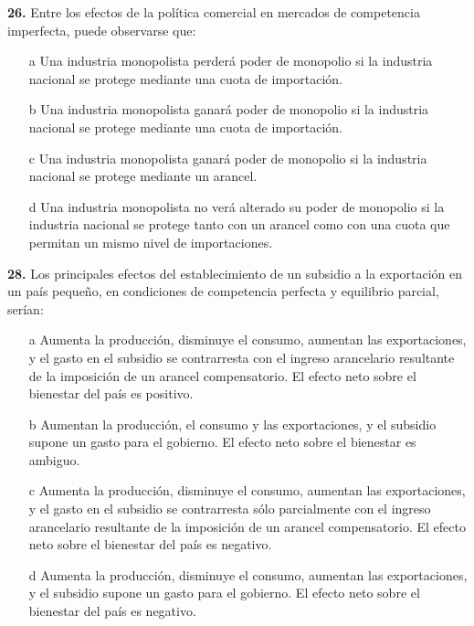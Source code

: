 \documentclass{nuevotema}
\begin{document}

\textbf{26.} Entre los efectos de la política comercial en mercados de competencia imperfecta, puede observarse que:

\begin{itemize}
 	\item[a] Una industria monopolista perderá poder de monopolio si la industria nacional se protege mediante una cuota de importación.
	\item[b] Una industria monopolista ganará poder de monopolio si la industria nacional se protege mediante una cuota de importación.
	\item[c] Una industria monopolista ganará poder de monopolio si la industria nacional se protege mediante un arancel.
	\item[d] Una industria monopolista no verá alterado su poder de monopolio si la industria nacional se protege tanto con un arancel como con una cuota que permitan un mismo nivel de importaciones.
\end{itemize}


\textbf{28.} Los principales efectos del establecimiento de un subsidio a la exportación en un país pequeño, en condiciones de competencia perfecta y equilibrio parcial, serían:

\begin{itemize}
	\item[a] Aumenta la producción, disminuye el consumo, aumentan las exportaciones, y el gasto en el subsidio se contrarresta con el ingreso arancelario resultante de la imposición de un arancel compensatorio. El efecto neto sobre el bienestar del país es positivo.
	\item[b] Aumentan la producción, el consumo y las exportaciones, y el subsidio supone un gasto para el gobierno. El efecto neto sobre el bienestar es ambiguo.
	\item[c] Aumenta la producción, disminuye el consumo, aumentan las exportaciones, y el gasto en el subsidio se contrarresta sólo parcialmente con el ingreso arancelario resultante de la imposición de un arancel compensatorio. El efecto neto sobre el bienestar del país es negativo.
	\item[d] Aumenta la producción, disminuye el consumo, aumentan las exportaciones, y el subsidio supone un gasto para el gobierno. El efecto neto sobre el bienestar del país es negativo.
\end{itemize}
\end{document}
